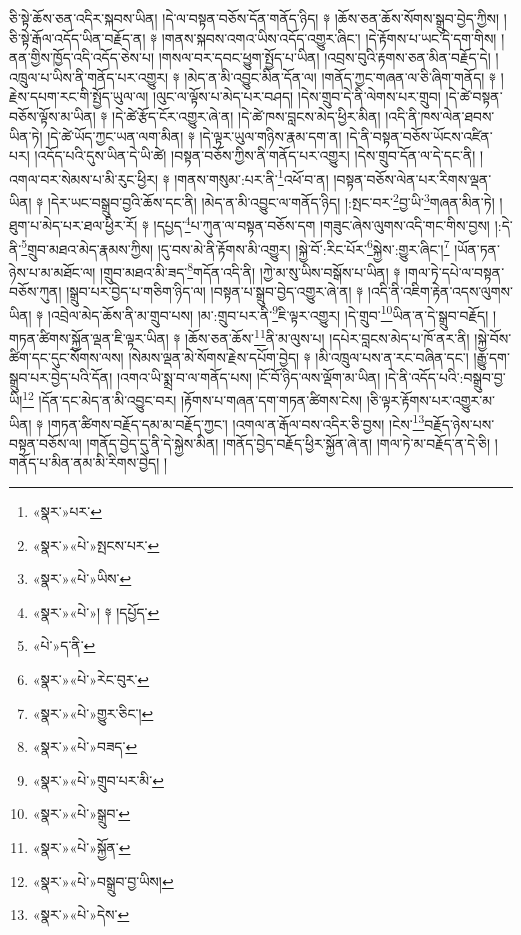 ཅི་སྟེ་ཆོས་ཅན་འདིར་སྐབས་ཡིན། །དེ་ལ་བསྟན་བཅོས་དོན་གནོད་ཉིད། ༈ །ཆོས་ཅན་ཆོས་སོགས་སྒྲུབ་བྱེད་ཀྱིས། །ཅི་སྟེ་རྒོལ་འདོད་ཡིན་བརྗོད་ན། ༈ །གནས་སྐབས་འགའ་ཡིས་འདོད་འགྱུར་ཞིང་། །དེ་རྟོགས་པ་ཡང་དེ་དག་གིས། །ནན་གྱིས་ཁྱོད་འདི་འདོད་ཅེས་པ། །གསལ་བར་དབང་ཕྱུག་སྤྱོད་པ་ཡིན། །འབྲས་བུའི་རྟགས་ཅན་མིན་བརྗོད་དེ། །འཁྲུལ་པ་ཡིས་ནི་གནོད་པར་འགྱུར། ༈ །མེད་ན་མི་འབྱུང་མིན་དོན་ལ། །གནོད་ཀྱང་གཞན་ལ་ཅི་ཞིག་གནོད། ༈ །རྗེས་དཔག་རང་གི་སྤྱོད་ཡུལ་ལ། །ལུང་ལ་ལྟོས་པ་མེད་པར་བཤད། །དེས་གྲུབ་དེ་ནི་ལེགས་པར་གྲུབ། །དེ་ཚེ་བསྟན་བཅོས་ལྟོས་མ་ཡིན། ༈ །དེ་ཚེ་རྩོད་ངོར་འགྱུར་ཞེ་ན། །དེ་ཚེ་ཁས་བླངས་མེད་ཕྱིར་མིན། །འདི་ནི་ཁས་ལེན་ཐབས་ཡིན་ཏེ། །དེ་ཚེ་ཡོད་ཀྱང་ཡན་ལག་མིན། ༈ །དེ་ལྟར་ཡུལ་གཉིས་རྣམ་དག་ན། །དེ་ནི་བསྟན་བཅོས་ཡོངས་འཛིན་པར། །འདོད་པའི་དུས་ཡིན་དེ་ཡི་ཚེ། །བསྟན་བཅོས་ཀྱིས་ནི་གནོད་པར་འགྱུར། །དེས་གྲུབ་དོན་ལ་དེ་དང་ནི། །འགལ་བར་སེམས་པ་མི་རུང་ཕྱིར། ༈ །གནས་གསུམ་:པར་ནི་\footnote{«སྣར་»པར་}འཕོ་བ་ན། །བསྟན་བཅོས་ལེན་པར་རིགས་ལྡན་ཡིན། ༈ །དེར་ཡང་བསྒྲུབ་བྱའི་ཆོས་དང་ནི། །མེད་ན་མི་འབྱུང་ལ་གནོད་ཉིད། །:སྤང་བར་\footnote{«སྣར་»«པེ་»སྤངས་པར་}བྱ་ཡི་\footnote{«སྣར་»«པེ་»ཡིས་}གཞན་མིན་ཏེ། །ཐུག་པ་མེད་པར་ཐལ་ཕྱིར་རོ། ༈ །དཔྱད་\footnote{«སྣར་»«པེ་»། ༈ །དཔྱོད་}པ་ཀུན་ལ་བསྟན་བཅོས་དག །གཟུང་ཞེས་ལུགས་འདི་གང་གིས་བྱས། །:དེ་ནི་\footnote{«པེ་»ད་ནི་}གྲུབ་མཐའ་མེད་རྣམས་ཀྱིས། །དུ་བས་མེ་ནི་རྟོགས་མི་འགྱུར། །སྐྱེ་བོ་:རིང་པོར་\footnote{«སྣར་»«པེ་»རེང་བུར་}སྐྱེས་:གྱུར་ཞིང་།\footnote{«སྣར་»«པེ་»གྱུར་ཅིང་།} །ཡོན་ཏན་ཉེས་པ་མ་མཐོང་ལ། །གྲུབ་མཐའ་མི་ཟད་\footnote{«སྣར་»«པེ་»བཟད་}གདོན་འདི་ནི། །ཀྱེ་མ་སུ་ཡིས་བསྒོས་པ་ཡིན། ༈ །གལ་ཏེ་དཔེ་ལ་བསྟན་བཅོས་ཀུན། །སྒྲུབ་པར་བྱེད་པ་གཅིག་ཉིད་ལ། །བསྟན་པ་སྒྲུབ་བྱེད་འགྱུར་ཞེ་ན། ༈ །འདི་ནི་འཇིག་རྟེན་འདས་ལུགས་ཡིན། ༈ །འབྲེལ་མེད་ཆོས་ནི་མ་གྲུབ་པས། །མ་:གྲུབ་པར་ནི་\footnote{«སྣར་»«པེ་»གྲུབ་པར་མི་}ཇི་ལྟར་འགྱུར། །དེ་གྲུབ་\footnote{«སྣར་»«པེ་»སྒྲུབ་}ཡིན་ན་དེ་སྒྲུབ་བརྗོད། །གཏན་ཚིགས་སྐྱོན་ལྡན་ཇི་ལྟར་ཡིན། ༈ །ཆོས་ཅན་ཆོས་\footnote{«སྣར་»«པེ་»སྐྱོན་}ནི་མ་ལུས་པ། །དཔེར་བླངས་མེད་པ་ཁོ་ནར་ནི། །སྐྱེ་བོས་ཚིག་དང་དུང་སོགས་ལས། །སེམས་ལྡན་མེ་སོགས་རྗེས་དཔོག་བྱེད། ༈ །མི་འཁྲུལ་པས་ན་རང་བཞིན་དང་། །རྒྱུ་དག་སྒྲུབ་པར་བྱེད་པའི་དོན། །འགའ་ཡི་སྨྲ་བ་ལ་གནོད་པས། །ངོ་བོ་ཉིད་ལས་ལྡོག་མ་ཡིན། །དེ་ནི་འདོད་པའི་:བསྒྲུབ་བྱ་ཡི།\footnote{«སྣར་»«པེ་»བསྒྲུབ་བྱ་ཡིས།} །དོན་དང་མེད་ན་མི་འབྱུང་བར། །རྟོགས་པ་གཞན་དག་གཏན་ཚིགས་ངེས། །ཅི་ལྟར་རྟོགས་པར་འགྱུར་མ་ཡིན། ༈ །གཏན་ཚིགས་བརྗོད་དམ་མ་བརྗོད་ཀྱང་། །འགལ་ན་རྒོལ་བས་འདིར་ཅི་བྱས། །ངེས་\footnote{«སྣར་»«པེ་»དེས་}བརྗོད་ཉེས་པས་བསྟན་བཅོས་ལ། །གནོད་བྱེད་དུ་ནི་དེ་སྐྱེས་མིན། །གནོད་བྱེད་བརྗོད་ཕྱིར་སྐྱོན་ཞེ་ན། །གལ་ཏེ་མ་བརྗོད་ན་དེ་ཅི། །གནོད་པ་མིན་ནམ་མི་རིགས་བྱེད། །
